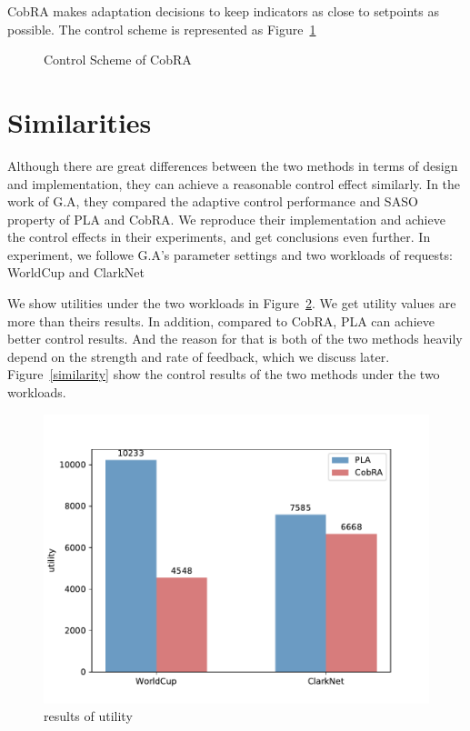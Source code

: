 \documentclass[sigconf]{acmart}
\begin{document}
CobRA makes adaptation decisions to keep indicators as close to setpoints as possible. The control scheme is represented as Figure~\ref{cobra}
\begin{figure}[h]
	\centering
	\caption{Control Scheme of CobRA}
	\label{cobra}
\end{figure}
 
\section{Similarities}
Although there are great differences between the two methods in terms of design and implementation, they can achieve a reasonable control effect similarly. In the work of G.A\cite{GA}, they compared the adaptive control performance and SASO property\cite{saso} of PLA and CobRA. We reproduce their implementation and achieve the control effects in their experiments, and get conclusions even further. In experiment, we followe G.A's parameter settings and two workloads of requests: WorldCup\cite{worldcup} and ClarkNet\cite{clarknet}

We show utilities under the two workloads in Figure~\ref{utility-simi}.  We get utility values are more than theirs results. In addition, compared to CobRA, PLA can achieve better control results. And the reason for that is both of the two methods heavily depend on the strength and rate of feedback, which we discuss later. Figure~\ref{similarity} show the control results of the two methods under the two workloads.
\begin{figure}[h]
	\centering
	\includegraphics[width=\linewidth]{utility-simi}
	\caption{results of utility}
	\label{utility-simi}
\end{figure}
\end{document}
